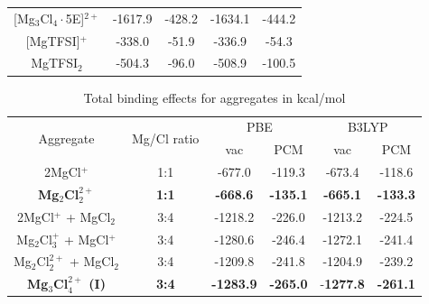 \begin{table}
\begin{tabular}{ccccc}
{[}Mg$_3$Cl$_4 \cdot$5E{]}$^{2+}$                              & -1617.9                    & -428.2                     & -1634.1                    & -444.2                     \\
{[}MgTFSI{]}$^{+}$                                  & -338.0                     & -51.9                      & -336.9                     & -54.3                      \\
MgTFSI$_2$                                        & -504.3                     & -96.0                      & -508.9                     & -100.5       \\
\bottomrule
\end{tabular}
\end{table}

\begin{table}
\centering
    \caption[Total binding effects (as defined by equation~\ref{eq:mg-cl-dme-binding-effect}) for aggregates in kcal/mol]{Total binding effects for aggregates in kcal/mol}
    \label{tab:mg-cl-dme-binding-effects}
\begin{tabular}{cccccc}
\toprule
\multirow{2}{*}{Aggregate} & \multirow{2}{*}{Mg/Cl ratio} & \multicolumn{2}{c}{PBE} & \multicolumn{2}{c}{B3LYP} \\
                           &                              & vac         & PCM       & vac          & PCM        \\
\midrule
2MgCl$^{+}$                      & 1:1                          & -677.0      & -119.3    & -673.4       & -118.6     \\
\textbf{Mg$_2$Cl$_2^{2+}$}                  & \textbf{1:1}                         & \textbf{-668.6 }     & \textbf{-135.1}    & \textbf{-665.1}       & \textbf{-133.3 }   \\
2MgCl$^{+}$ + MgCl$_2$              & 3:4                          & -1218.2     & -226.0    & -1213.2      & -224.5     \\
Mg$_2$Cl$_3^{+}$ + MgCl$^{+}$              & 3:4                          & -1280.6     & -246.4    & -1272.1      & -241.4     \\
Mg$_2$Cl$_2^{2+}$ + MgCl$_2$             & 3:4                          & -1209.8     & -241.8    & -1204.9      & -239.2     \\
\textbf{Mg$_3$Cl$_4^{2+}$ (I) }                & \textbf{3:4}                          & \textbf{-1283.9}     & \textbf{-265.0 }   & -\textbf{1277.8}      & \textbf{-261.1}    \\
\bottomrule
\end{tabular}
\end{table}

